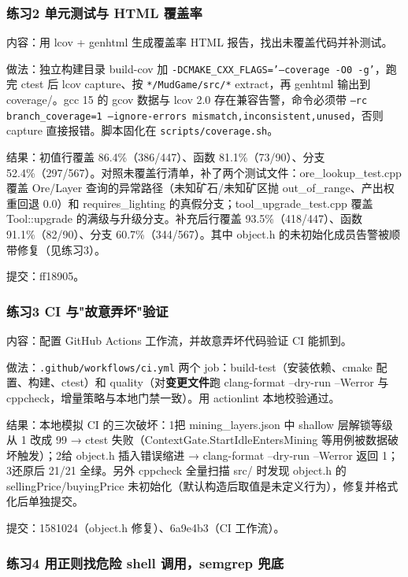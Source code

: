 \documentclass[UTF8]{ctexart}
\begin{document}
\subsubsection{练习2 单元测试与 HTML 覆盖率}

内容：用 lcov + genhtml 生成覆盖率 HTML 报告，找出未覆盖代码并补测试。

做法：独立构建目录 build-cov 加 \texttt{-DCMAKE\_CXX\_FLAGS='--coverage -O0 -g'}，跑完 ctest 后 lcov capture、按 \texttt{*/MudGame/src/*} extract，再 genhtml 输出到 coverage/。gcc 15 的 gcov 数据与 lcov 2.0 存在兼容告警，命令必须带 \texttt{--rc branch\_coverage=1 --ignore-errors mismatch,inconsistent,unused}，否则 capture 直接报错。脚本固化在 \texttt{scripts/coverage.sh}。

结果：初值行覆盖 86.4\%（386/447）、函数 81.1\%（73/90）、分支 52.4\%（297/567）。对照未覆盖行清单，补了两个测试文件：ore\_lookup\_test.cpp 覆盖 Ore/Layer 查询的异常路径（未知矿石/未知矿区抛 out\_of\_range、产出权重回退 0.0）和 requires\_lighting 的真假分支；tool\_upgrade\_test.cpp 覆盖 Tool::upgrade 的满级与升级分支。补充后行覆盖 93.5\%（418/447）、函数 91.1\%（82/90）、分支 60.7\%（344/567）。其中 object.h 的未初始化成员告警被顺带修复（见练习3）。

提交：ff18905。

\subsubsection{练习3 CI 与"故意弄坏"验证}

内容：配置 GitHub Actions 工作流，并故意弄坏代码验证 CI 能抓到。

做法：\texttt{.github/workflows/ci.yml} 两个 job：build-test（安装依赖、cmake 配置、构建、ctest）和 quality（对\textbf{变更文件}跑 clang-format --dry-run --Werror 与 cppcheck，增量策略与本地门禁一致）。用 actionlint 本地校验通过。

结果：本地模拟 CI 的三次破坏：1把 mining\_layers.json 中 shallow 层解锁等级从 1 改成 99 → ctest 失败（ContextGate.StartIdleEntersMining 等用例被数据破坏触发）；2给 object.h 插入错误缩进 → clang-format --dry-run --Werror 返回 1；3还原后 21/21 全绿。另外 cppcheck 全量扫描 src/ 时发现 object.h 的 sellingPrice/buyingPrice 未初始化（默认构造后取值是未定义行为），修复并格式化后单独提交。

提交：1581024（object.h 修复）、6a9e4b3（CI 工作流）。

\subsubsection{练习4 用正则找危险 shell 调用，semgrep 兜底}
\end{document}
